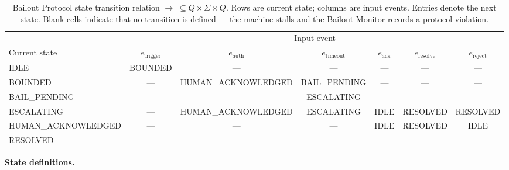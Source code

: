 \begin{table}[htbp]
\caption{Bailout Protocol state transition relation $\rightarrow \;\subseteq Q \times \Sigma \times Q$. Rows are current state; columns are input events. Entries denote the next state. Blank cells indicate that no transition is defined — the machine stalls and the Bailout Monitor records a protocol violation.}
\label{tab:bailout-transition}
\begin{tabular}{@{}lcccccc@{}}
\toprule
 & \multicolumn{6}{c}{Input event} \\
\cmidrule(l){2-7}
Current state & $e_{\text{trigger}}$ & $e_{\text{auth}}$ & $e_{\text{timeout}}$ & $e_{\text{ack}}$ & $e_{\text{resolve}}$ & $e_{\text{reject}}$ \\
\midrule
IDLE              & BOUNDED            & — & — & — & — & — \\
BOUNDED           & — & HUMAN\_ACKNOWLEDGED & BAIL\_PENDING & — & — & — \\
BAIL\_PENDING     & — & — & ESCALATING & — & — & — \\
ESCALATING        & — & HUMAN\_ACKNOWLEDGED & ESCALATING & IDLE & RESOLVED & RESOLVED \\
HUMAN\_ACKNOWLEDGED & — & — & — & IDLE & RESOLVED & IDLE \\
RESOLVED          & — & — & — & — & — & — \\
\bottomrule
\end{tabular}
\end{table}

\bigskip
\noindent\textbf{State definitions.}

